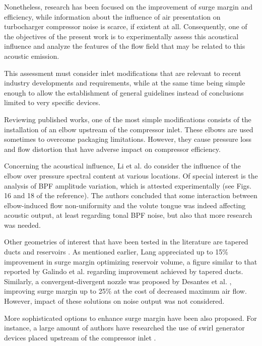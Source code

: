Nonetheless, research has been focused on the improvement of surge margin and efficiency, while information about the influence of air presentation on turbocharger compressor noise is scarce, if existent at all. Consequently, one of the objectives of the present work is to experimentally assess this acoustical influence and analyze the features of the flow field that may be related to this acoustic emission.

This assessment must consider inlet modifications that are relevant to recent industry developments and requirements, while at the same time being simple enough to allow the establishment of general guidelines instead of conclusions limited to very specific devices.

Reviewing published works, one of the most simple modifications consists of the installation of an elbow upstream of the compressor inlet. These elbows are used sometimes to overcome packaging limitations. However, they cause pressure loss \cite{engeda2003inlet,li2012numerical} and flow distortion \cite{serrano2013optimization} that have adverse impact on compressor efficiency.

Concerning the acoustical influence, Li et al. \cite{li2012numerical} do consider the influence of the elbow over pressure spectral content at various locations. Of special interest is the analysis of BPF amplitude variation, which is attested experimentally (see Figs. 16 and 18 of the reference). The authors concluded that some interaction between elbow-induced flow non-uniformity and the volute tongue was indeed affecting acoustic output, at least regarding tonal BPF noise, but also that more research was needed.

Other geometries of interest that have been tested in the literature are tapered ducts \cite{galindo2011measurement,lang2011contribucion} and reservoirs \cite{lang2011contribucion}. As mentioned earlier, Lang appreciated up to 15\% improvement in surge margin optimizing reservoir volume, a figure similar to that reported by Galindo et al. \cite{galindo2011measurement} regarding improvement achieved by tapered ducts. Similarly, a convergent-divergent nozzle was proposed by Desantes et al. \cite{desantes2011potential}, improving surge margin up to 25\% at the cost of decreased maximum air flow. However, impact of these solutions on noise output was not considered.

More sophisticated options to enhance surge margin have been also proposed. For instance, a large amount of authors have researched the use of swirl generator devices placed upstream of the compressor inlet \cite{kyrtatos1980application,coppinger2000performance}. 

